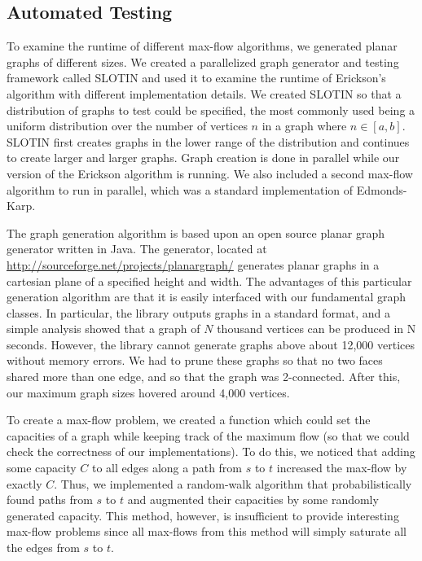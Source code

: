 \documentclass[12pt]{article}
\begin{document}
\subsection{Automated Testing}

To examine the runtime of different max-flow algorithms, we generated planar graphs of different sizes. We created a parallelized graph generator and testing framework called SLOTIN and used it to examine the runtime of Erickson's algorithm with different implementation details. We created SLOTIN so that a distribution of graphs to test could be specified, the most commonly used being a uniform distribution over the number of vertices $n$ in a graph where $n \in [a,b]$. SLOTIN first creates graphs in the lower range of the distribution and continues to create larger and larger graphs. Graph creation is done in parallel while our version of the Erickson algorithm is running. We also included a second max-flow algorithm to run in parallel, which was a standard implementation of Edmonds-Karp. 

The graph generation algorithm is based upon an open source planar graph generator written in Java. The generator, located at \url{http://sourceforge.net/projects/planargraph/} generates planar graphs in a cartesian plane of a specified height and width. The advantages of this particular generation algorithm are that it is easily interfaced with our fundamental graph classes. In particular, the library outputs graphs in a standard format, and a simple analysis showed that a graph of $N$ thousand vertices can be produced in N seconds. However, the library cannot generate graphs above about 12,000 vertices without memory errors.  We had to prune these graphs so that no two faces shared more than one edge, and so that the graph was 2-connected.  After this, our maximum graph sizes hovered around 4,000 vertices.

To create a max-flow problem, we created a function which could set the capacities of a graph while keeping track of the maximum flow (so that we could check the correctness of our implementations). To do this, we noticed that adding some capacity $C$ to all edges along a path from $s$ to $t$ increased the max-flow by exactly $C$. Thus, we implemented a random-walk algorithm that probabilistically found paths from $s$ to $t$ and augmented their capacities by some randomly generated capacity. This method, however, is insufficient to provide interesting max-flow problems since all max-flows from this method will simply saturate all the edges from $s$ to $t$. 
\end{document}
